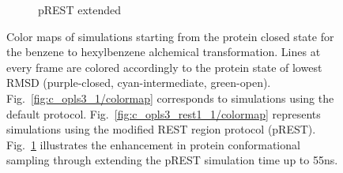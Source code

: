 \begin{figure}[!ht]
\begin{subfigure}{.5\textwidth}
\end{subfigure}\hfill
\centering
\begin{subfigure}{\textwidth}
   \centering
   \caption{pREST extended}
   \label{fig:c_opls3_rest1_1/cmap-45-55ns}
\end{subfigure}\hfill
\caption{Color maps of simulations starting from the protein closed state for the benzene to hexylbenzene alchemical transformation. 
Lines at every frame are colored accordingly to the protein state of lowest RMSD (purple-closed, cyan-intermediate, green-open). 
Fig.~\ref{fig:c_opls3_1/colormap} corresponds to simulations using the default protocol. Fig.~\ref{fig:c_opls3_rest1_1/colormap} represents simulations using the modified REST region protocol (pREST). Fig.~\ref{fig:c_opls3_rest1_1/cmap-45-55ns} illustrates the enhancement in protein conformational sampling through extending the pREST simulation time up to 55ns. 
}
\label{fig:benzene_to_n-hexyl_colormap}
\end{figure}

